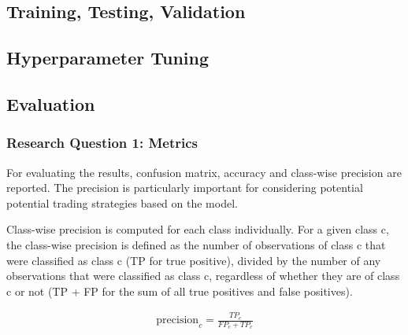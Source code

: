 \documentclass{article}
\begin{document}
	

	
	
	\subsection{Training, Testing, Validation}
	
	\subsection{Hyperparameter Tuning}
	
	\subsection{Evaluation}
	
	\subsubsection{Research Question 1: Metrics}
	
	For evaluating the results, confusion matrix, accuracy and class-wise precision are reported. The precision is particularly important for considering potential potential trading strategies based on the model.
	
	Class-wise precision is computed for each class individually. For a given class c, the class-wise precision is defined as the number of observations of class c that were classified as class c (TP for true positive), divided by the number of any observations that were classified as class c, regardless of whether they are of class c or not (TP + FP for the sum of all true positives and false positives).
	
	\begin{align}
	\mathrm{precision}_c = \frac{TP_c}{FP_c + TP_c}
	\end{align}
	
\end{document}
